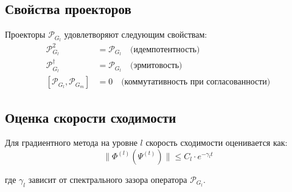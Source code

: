 \documentclass[12pt,a4paper]{article}
\newcommand{\calP}{\mathcal{P}}
\newcommand{\PhiFunc}{\Phi}
\begin{document}
\subsection{Свойства проекторов}

Проекторы $\calP_{G_l}$ удовлетворяют следующим свойствам:
\begin{align}
\calP_{G_l}^2 &= \calP_{G_l} \quad \text{(идемпотентность)} \\
\calP_{G_l}^\dagger &= \calP_{G_l} \quad \text{(эрмитовость)} \\
[\calP_{G_l}, \calP_{G_m}] &= 0 \quad \text{(коммутативность при согласованности)}
\end{align}

\subsection{Оценка скорости сходимости}

Для градиентного метода на уровне $l$ скорость сходимости оценивается как:
\begin{equation}
\|\PhiFunc^{(l)}(\Psi^{(t)})\| \leq C_l \cdot e^{-\gamma_l t}
\end{equation}

где $\gamma_l$ зависит от спектрального зазора оператора $\calP_{G_l}$.
\end{document}
